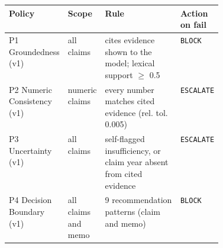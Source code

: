 \begin{tabular}{@{}llp{0.42\linewidth}l@{}}
\toprule
\textbf{Policy} & \textbf{Scope} & \textbf{Rule} & \textbf{Action on fail} \\
\midrule
P1 Groundedness (v1) & all claims & cites evidence shown to the model; lexical support $\geq$ 0.5 & \texttt{BLOCK} \\
P2 Numeric Consistency (v1) & numeric claims & every number matches cited evidence (rel. tol. 0.005) & \texttt{ESCALATE} \\
P3 Uncertainty (v1) & all claims & self-flagged insufficiency, or claim year absent from cited evidence & \texttt{ESCALATE} \\
P4 Decision Boundary (v1) & all claims and memo & 9 recommendation patterns (claim and memo) & \texttt{BLOCK} \\
\bottomrule
\end{tabular}